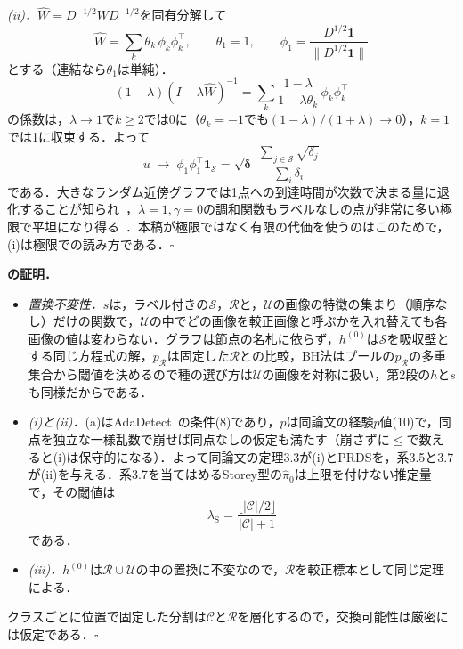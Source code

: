 \textit{(ii)．}$\hat W=D^{-1/2}WD^{-1/2}$を固有分解して
\begin{equation*}
\hat W=\sum_k\theta_k\,\phi_k\phi_k^{\top},\qquad\theta_1=1,\qquad\phi_1=\frac{D^{1/2}\mathbf{1}}{\|D^{1/2}\mathbf{1}\|}
\end{equation*}
とする（連結なら$\theta_1$は単純）．
\begin{equation*}
(1-\lambda)(I-\lambda\hat W)^{-1}=\sum_k\frac{1-\lambda}{1-\lambda\theta_k}\,\phi_k\phi_k^{\top}
\end{equation*}
の係数は，$\lambda\to1$で$k\ge2$では0に（$\theta_k=-1$でも$(1-\lambda)/(1+\lambda)\to0$），$k=1$では1に収束する．よって
\begin{equation*}
u\;\longrightarrow\;\phi_1\phi_1^{\top}\mathbf{1}_{\mathcal{S}}=\sqrt{\boldsymbol{\delta}}\;\frac{\sum_{j\in\mathcal{S}}\sqrt{\delta_j}}{\sum_i\delta_i}
\end{equation*}
である．大きなランダム近傍グラフでは1点への到達時間が次数で決まる量に退化することが知られ~\cite{vonluxburg2014hitting}，$\lambda{=}1,\gamma{=}0$の調和関数もラベルなしの点が非常に多い極限で平坦になり得る~\cite{nadler2009limit}．本稿が極限ではなく有限の代価を使うのはこのためで，(i)は極限での読み方である．$\square$

\appblock
\textbf{\TValid{}の証明．}
\begin{itemize}
\item[(a)] \textit{置換不変性．}$s$は，ラベル付きの$\mathcal{S}$，$\mathcal{R}$と，$\mathcal{U}$の画像の特徴の集まり（順序なし）だけの関数で，$\mathcal{U}$の中でどの画像を較正画像と呼ぶかを入れ替えても各画像の値は変わらない．グラフは節点の名札に依らず，$h^{(0)}$は$\mathcal{S}$を吸収壁とする同じ方程式の解，$p_{\mathcal{R}}$は固定した$\mathcal{R}$との比較，BH法はプールの$p_{\mathcal{R}}$の多重集合から閾値を決めるので種の選び方は$\mathcal{U}$の画像を対称に扱い，第2段の$h$と$s$も同様だからである．
\item[(b)] \textit{(i)と(ii)．}(a)はAdaDetect~\cite{marandon2024adadetect}の条件(8)であり，$p$は同論文の経験$p$値(10)で，同点を独立な一様乱数で崩せば同点なしの仮定も満たす（崩さずに$\le$で数えると(i)は保守的になる）．よって同論文の定理3.3が(i)とPRDSを，系3.5と3.7が(ii)を与える．系3.7を当てはめるStorey型の$\hat\pi_0$は上限を付けない推定量で，その閾値は
\begin{equation*}
\lambda_{\mathrm{S}}=\frac{\lfloor|\mathcal{C}|/2\rfloor}{|\mathcal{C}|+1}
\end{equation*}
である．
\item[(c)] \textit{(iii)．}$h^{(0)}$は$\mathcal{R}\cup\mathcal{U}$の中の置換に不変なので，$\mathcal{R}$を較正標本として同じ定理による．
\end{itemize}
クラスごとに位置で固定した分割は$\mathcal{C}$と$\mathcal{R}$を層化するので，交換可能性は厳密には仮定である．$\square$

